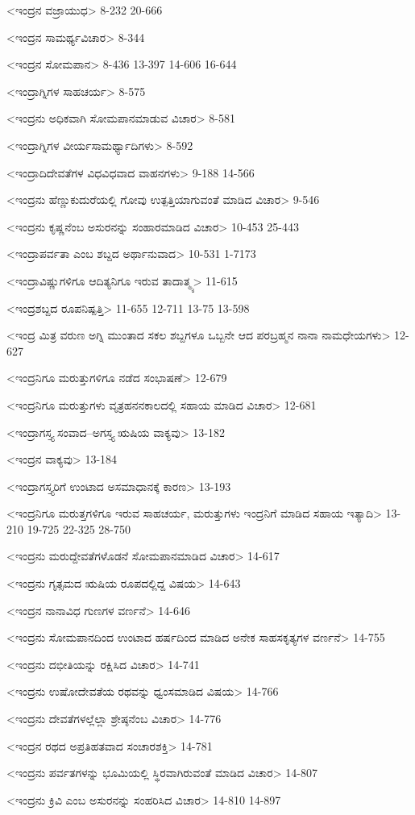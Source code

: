 <ಇಂದ್ರನ ವಜ್ರಾಯುಧ>
8-232 
20-666

<ಇಂದ್ರನ ಸಾಮರ್ಥ್ಯವಿಚಾರ>
8-344

<ಇಂದ್ರನ ಸೋಮಪಾನ>
8-436 
13-397
14-606 
16-644

<ಇಂದ್ರಾಗ್ನಿಗಳ ಸಾಹಚರ್ಯ>
8-575

<ಇಂದ್ರನು ಅಧಿಕವಾಗಿ ಸೋಮಪಾನಮಾಡುವ ವಿಚಾರ>
8-581

<ಇಂದ್ರಾಗ್ನಿಗಳ ವೀರ್ಯಸಾಮರ್ಥ್ಯಾದಿಗಳು>
8-592

<ಇಂದ್ರಾದಿದೇವತೆಗಳ ವಿಧವಿಧವಾದ ವಾಹನಗಳು>
9-188
14-566

<ಇಂದ್ರನು ಹೆಣ್ಣುಕುದುರೆಯಲ್ಲಿ ಗೋವು ಉತ್ಪತ್ತಿಯಾಗುವಂತೆ ಮಾಡಿದ ವಿಚಾರ>
9-546

<ಇಂದ್ರನು ಕೃಷ್ಣನೆಂಬ ಅಸುರನನ್ನು ಸಂಹಾರಮಾಡಿದ ವಿಚಾರ>
10-453
25-443

<ಇಂದ್ರಾಪರ್ವತಾ ಎಂಬ ಶಬ್ದದ ಅರ್ಥಾನುವಾದ>
10-531
1-7173

<ಇಂದ್ರಾವಿಷ್ಣುಗಳಿಗೂ ಆದಿತ್ಯನಿಗೂ ಇರುವ ತಾದಾತ್ಮ್ಯ>
11-615


<ಇಂದ್ರಶಬ್ದದ ರೂಪನಿಷ್ಪತ್ತಿ>
11-655
12-711
13-75
13-598

<ಇಂದ್ರ ಮಿತ್ರ ವರುಣ ಅಗ್ನಿ ಮುಂತಾದ ಸಕಲ ಶಬ್ದಗಳೂ ಒಬ್ಬನೇ ಆದ ಪರಬ್ರಹ್ಮನ ನಾನಾ ನಾಮಧೇಯಗಳು>
12-627


<ಇಂದ್ರನಿಗೂ ಮರುತ್ತುಗಳಿಗೂ ನಡೆದ ಸಂಭಾಷಣೆ>
12-679

<ಇಂದ್ರನಿಗೂ ಮರುತ್ತುಗಳು ವೃತ್ರಹನನಕಾಲದಲ್ಲಿ ಸಹಾಯ ಮಾಡಿದ ವಿಚಾರ>
12-681

<ಇಂದ್ರಾಗಸ್ತ್ಯ ಸಂವಾದ–ಅಗಸ್ತ್ಯ ಋಷಿಯ ವಾಕ್ಯವು>
13-182

<ಇಂದ್ರನ ವಾಕ್ಯವು>
13-184

<ಇಂದ್ರಾಗಸ್ತ್ಯರಿಗೆ ಉಂಟಾದ ಅಸಮಾಧಾನಕ್ಕೆ ಕಾರಣ>
13-193

<ಇಂದ್ರನಿಗೂ ಮರುತ್ತಗಳಿಗೂ ಇರುವ ಸಾಹಚರ್ಯ, ಮರುತ್ತುಗಳು ಇಂದ್ರನಿಗೆ ಮಾಡಿದ ಸಹಾಯ ಇತ್ಯಾದಿ>
13-210 
19-725 
22-325
28-750

<ಇಂದ್ರನು ಮರುದ್ದೇವತೆಗಳೊಡನೆ ಸೋಮಪಾನಮಾಡಿದ ವಿಚಾರ>
14-617

<ಇಂದ್ರನು ಗೃತ್ಸಮದ ಋಷಿಯ ರೂಪದಲ್ಲಿದ್ದ ವಿಷಯ>
14-643

<ಇಂದ್ರನ ನಾನಾವಿಧ ಗುಣಗಳ ವರ್ಣನೆ>
14-646

<ಇಂದ್ರನು ಸೋಮಪಾನದಿಂದ ಉಂಟಾದ ಹರ್ಷದಿಂದ ಮಾಡಿದ ಅನೇಕ ಸಾಹಸಕೃತ್ಯಗಳ ವರ್ಣನೆ>
14-755

<ಇಂದ್ರನು ದಭೀತಿಯನ್ನು ರಕ್ಷಿಸಿದ ವಿಚಾರ>
14-741

<ಇಂದ್ರನು ಉಷೋದೇವತೆಯ ರಥವನ್ನು ಧ್ವಂಸಮಾಡಿದ ವಿಷಯ>
14-766

<ಇಂದ್ರನು ದೇವತೆಗಳಲ್ಲೆಲ್ಲಾ ಶ್ರೇಷ್ಠನೆಂಬ ವಿಚಾರ>
14-776

<ಇಂದ್ರನ ರಥದ ಅಪ್ರತಿಹತವಾದ ಸಂಚಾರಶಕ್ತಿ>
14-781

<ಇಂದ್ರನು ಪರ್ವತಗಳನ್ನು ಭೂಮಿಯಲ್ಲಿ ಸ್ಥಿರವಾಗಿರುವಂತೆ ಮಾಡಿದ ವಿಚಾರ>
14-807

<ಇಂದ್ರನು ಕ್ರಿವಿ ಎಂಬ ಅಸುರನನ್ನು ಸಂಹರಿಸಿದ ವಿಚಾರ>
14-810
14-897


